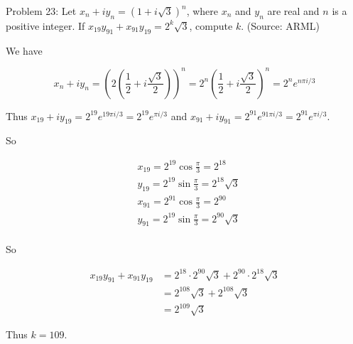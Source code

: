 Problem 23: Let $x_n + i y_n = (1 + i \sqrt{3})^n$, where $x_n$ and $y_n$ are real and $n$ is a positive integer. If $x_{19} y_{91} + x_{91} y_{19} = 2^k \sqrt{3}$, compute $k$. (Source: ARML)

We have

$$ x_n + iy_n = \left(2\left(\frac{1}{2} + i\frac{\sqrt 3}{2}\right)\right)^n = 2^n \left(\frac{1}{2} + i\frac{\sqrt 3}{2} \right)^n = 2^n e^{n \pi i / 3} $$

Thus $x_{19} + i y_{19} = 2^{19} e^{19 \pi i / 3} = 2^{19} e^{\pi i / 3}$ and $x_{91} + i y_{91} = 2^{91} e^{91 \pi i / 3} = 2^{91} e^{\pi i / 3}$.

So

\begin{align*}
& x_{19} = 2^{19} \cos \frac{\pi}{3} = 2^{18} \\
& y_{19} = 2^{19} \sin \frac{\pi}{3} = 2^{18} \sqrt{3} \\
& x_{91} = 2^{91} \cos \frac{\pi}{3} = 2^{90} \\
& y_{91} = 2^{19} \sin \frac{\pi}{3} = 2^{90} \sqrt{3} \\
\end{align*}

So

\begin{align*}
x_{19} y_{91} + x_{91} y_{19} &= 2^{18} \cdot 2^{90} \sqrt{3} + 2^{90} \cdot 2^{18} \sqrt{3} \\
&= 2^{108} \sqrt 3 + 2^{108} \sqrt 3 \\
&= 2^{109} \sqrt 3
\end{align*}

Thus $\boxed{k = 109}$.
